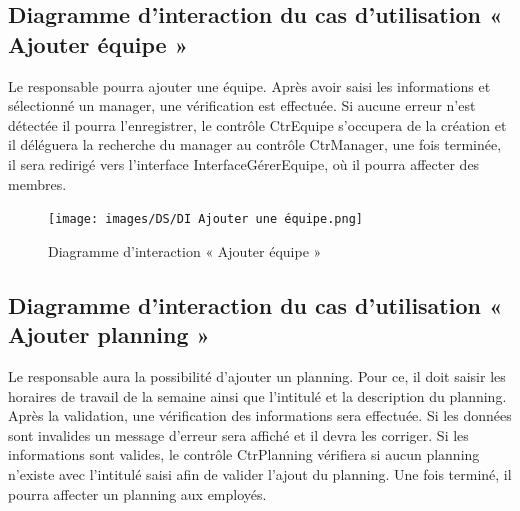 \subsection*{Diagramme d'interaction du cas d'utilisation « Ajouter équipe »}
Le responsable pourra ajouter une équipe. Après avoir saisi les informations et
sélectionné un manager, une vérification est effectuée. Si aucune erreur n’est
détectée il pourra l’enregistrer, le contrôle CtrEquipe s’occupera de la
création et il déléguera la recherche du manager au contrôle CtrManager, une
fois terminée, il sera
redirigé vers l’interface InterfaceGérerEquipe, où il pourra affecter des
membres.

\clearpage

\begin{figure}[h!]
    \centering
    \texttt{[image: images/DS/DI Ajouter une équipe.png]}
    \caption{Diagramme d'interaction « Ajouter équipe »}
    \label{fig38}
\end{figure}

\subsection*{Diagramme d'interaction du cas d'utilisation « Ajouter planning »}
Le responsable aura la possibilité d’ajouter un planning. Pour ce, il doit saisir les
horaires de travail de la semaine ainsi que l’intitulé et la description du
planning.  Après la validation, une vérification des informations sera
effectuée. Si les données sont invalides un message d’erreur sera affiché et
il devra les corriger. Si les informations sont valides, le contrôle
CtrPlanning vérifiera si aucun planning n’existe avec l’intitulé saisi afin de
valider l’ajout du planning. Une fois terminé, il pourra affecter un
planning aux employés.

\clearpage

